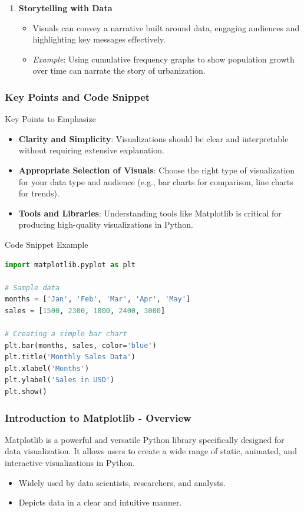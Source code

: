 \documentclass{beamer}
\begin{document}
\begin{frame}[fragile]
\begin{enumerate}
        \item \textbf{Storytelling with Data}
            \begin{itemize}
                \item Visuals can convey a narrative built around data, engaging audiences and highlighting key messages effectively.
                \item \textit{Example}: Using cumulative frequency graphs to show population growth over time can narrate the story of urbanization.
            \end{itemize}
    \end{enumerate}
\end{frame}

\begin{frame}[fragile]
    \frametitle{Key Points and Code Snippet}
    \begin{block}{Key Points to Emphasize}
        \begin{itemize}
            \item \textbf{Clarity and Simplicity}: Visualizations should be clear and interpretable without requiring extensive explanation.
            \item \textbf{Appropriate Selection of Visuals}: Choose the right type of visualization for your data type and audience (e.g., bar charts for comparison, line charts for trends).
            \item \textbf{Tools and Libraries}: Understanding tools like Matplotlib is critical for producing high-quality visualizations in Python.
        \end{itemize}
    \end{block}

    \begin{block}{Code Snippet Example}
    \begin{lstlisting}[language=Python]
import matplotlib.pyplot as plt

# Sample data
months = ['Jan', 'Feb', 'Mar', 'Apr', 'May']
sales = [1500, 2300, 1800, 2400, 3000]

# Creating a simple bar chart
plt.bar(months, sales, color='blue')
plt.title('Monthly Sales Data')
plt.xlabel('Months')
plt.ylabel('Sales in USD')
plt.show()
    \end{lstlisting}
    \end{block}
\end{frame}

\begin{frame}[fragile]
    \frametitle{Introduction to Matplotlib - Overview}
    Matplotlib is a powerful and versatile Python library specifically designed for data visualization. It allows users to create a wide range of static, animated, and interactive visualizations in Python. 
    \begin{itemize}
        \item Widely used by data scientists, researchers, and analysts.
        \item Depicts data in a clear and intuitive manner.
    \end{itemize}
\end{frame}
\end{document}

